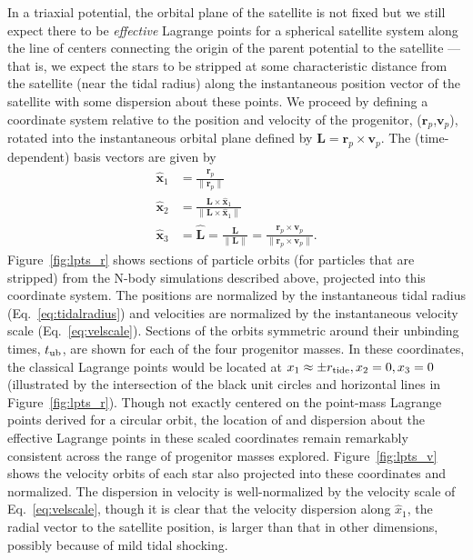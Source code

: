 \documentclass{emulateapj}
\newcommand{\rtide}{r_{\rm tide}}
\newcommand{\bs}{\boldsymbol}
\newcommand{\tub}{t_{\rm ub}}
\begin{document}
In a triaxial potential, the orbital plane of the satellite is not fixed but we still expect there to be \emph{effective} Lagrange points for a spherical satellite system along the line of centers connecting the origin of the parent potential to the satellite --- that is, we expect the stars to be stripped at some characteristic distance from the satellite (near the tidal radius) along the instantaneous position vector of the satellite with some dispersion about these points. We proceed by defining a coordinate system relative to the position and velocity of the progenitor, ($\bs{r}_p$,$\bs{v}_p$), rotated into the instantaneous orbital plane defined by $\bs{L} = \bs{r}_p \times \bs{v}_p$. The (time-dependent) basis vectors are given by
\begin{align}
	\hat{\bs{x}}_1 &= \frac{\bs{r}_p}{\|\bs{r}_p\|}\label{eq:x1}\\
	\hat{\bs{x}}_2 &= \frac{\bs{L} \times \hat{\bs{x}}_1}{\|\bs{L} \times \hat{\bs{x}}_1\|}\\
	\hat{\bs{x}}_3 &= \hat{\bs{L}} = \frac{\bs{L}}{\|\bs{L}\|} = \frac{\bs{r}_p \times \bs{v}_p}{\|\bs{r}_p \times \bs{v}_p\|}\label{eq:x3}.
\end{align}
Figure~\ref{fig:lpts_r} shows sections of particle orbits (for particles that are stripped) from the N-body simulations described above, projected into this coordinate system. The positions are normalized by the instantaneous tidal radius (Eq.~\ref{eq:tidalradius}) and velocities are normalized by the instantaneous velocity scale (Eq.~\ref{eq:velscale}). Sections of the orbits symmetric around their unbinding times, $\tub$, are shown for each of the four progenitor masses. In these coordinates, the classical Lagrange points would be located at $x_1\approx\pm\rtide,x_2=0,x_3=0$ (illustrated by the intersection of the black unit circles and horizontal lines in Figure~\ref{fig:lpts_r}). Though not exactly centered on the point-mass Lagrange points derived for a circular orbit, the location of and dispersion about the effective Lagrange points in these scaled coordinates remain remarkably consistent across the range of progenitor masses explored. Figure~\ref{fig:lpts_v} shows the velocity orbits of each star also projected into these coordinates and normalized. The dispersion in velocity is well-normalized by the velocity scale of Eq.~\ref{eq:velscale}, though it is clear that the velocity dispersion along $\hat{x}_1$, the radial vector to the satellite position, is larger than that in other dimensions, possibly because of mild tidal shocking. 
\end{document}
